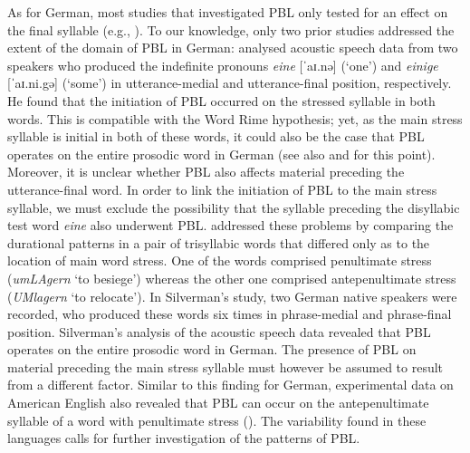 \documentclass[output=paper]{langscibook}
\begin{document}
As for German, most studies that investigated PBL only tested for an effect on the final syllable (e.g., \citealt{PetersEtal2005, SchuboeEtal2015, PetroneEtal2017}). To our knowledge, only two prior studies addressed the extent of the domain of PBL in German: \citet{Kohler1983} analysed acoustic speech data from two speakers who produced the indefinite pronouns \textit{eine} [ˈaɪ.nə] (`one') and \textit{einige} [ˈaɪ.ni.gə] (`some') in utterance-medial and utterance-final position, respectively. He found that the initiation of PBL occurred on the stressed syllable in both words. This is compatible with the Word Rime hypothesis; yet, as the main stress syllable is initial in both of these words, it could also be the case that PBL operates on the entire prosodic word in German (see also \citealt{Silverman1990} and \citealt{TurkShattuck-Hufnagel2007} for this point). Moreover, it is unclear whether PBL also affects material preceding the utterance-final word. In order to link the initiation of PBL to the main stress syllable, we must exclude the possibility that the syllable preceding the disyllabic test word \textit{eine} also underwent PBL. \citet{Silverman1990} addressed these problems by comparing the durational patterns in a pair of trisyllabic words that differed only as to the location of main word stress. One of the words comprised penultimate stress (\textit{umLAgern} `to besiege') whereas the other one comprised antepenultimate stress (\textit{UMlagern} `to relocate'). In Silverman's study, two German native speakers were recorded, who produced these words six times in phrase-medial and phrase-final position. Silverman's analysis of the acoustic speech data revealed that PBL operates on the entire prosodic word in German. The presence of PBL on material preceding the main stress syllable must however be assumed to result from a different factor. Similar to this finding for German, experimental data on American English also revealed that PBL can occur on the antepenultimate syllable of a word with penultimate stress (\citealt{ChoEtal2013}). The variability found in these languages calls for further investigation of the patterns of PBL.
\end{document}
